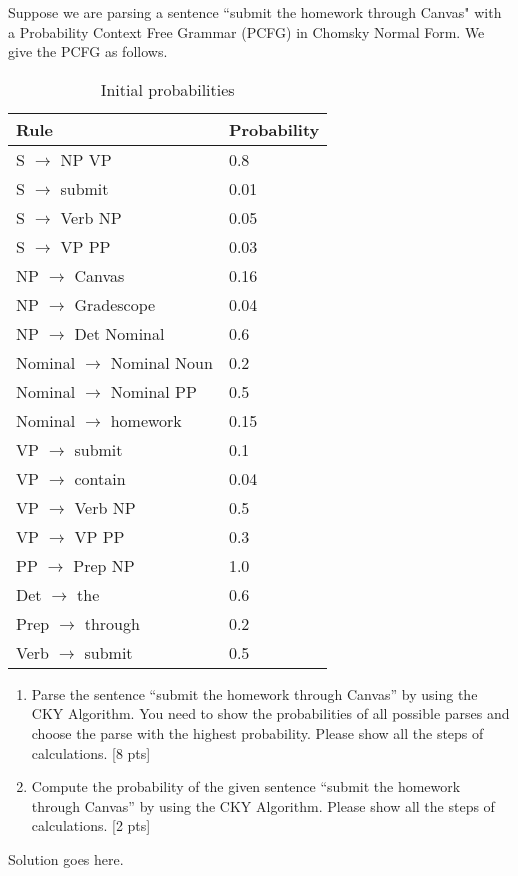 Suppose we are parsing a sentence ``submit the homework through Canvas" with a Probability Context Free Grammar (PCFG) in Chomsky Normal Form. We give the PCFG as follows.

\begin{table}[h]
\centering
\begin{tabular}{|l|l|}
\hline
Rule & Probability  \\ \hline
S $\longrightarrow$ NP VP &  0.8       \\ \hline
S $\longrightarrow$ submit &    0.01      \\ \hline
S $\longrightarrow$ Verb NP &    0.05     \\ \hline
S $\longrightarrow$ VP PP &    0.03     \\ \hline
NP $\longrightarrow$ Canvas &    0.16     \\ \hline
NP $\longrightarrow$ Gradescope &    0.04     \\ \hline
NP $\longrightarrow$ Det Nominal &    0.6     \\ \hline
Nominal $\longrightarrow$ Nominal Noun &    0.2     \\ \hline
Nominal $\longrightarrow$ Nominal PP &    0.5     \\ \hline
Nominal $\longrightarrow$ homework &    0.15     \\ \hline
VP $\longrightarrow$ submit &    0.1     \\ \hline
VP $\longrightarrow$ contain &    0.04     \\ \hline
VP $\longrightarrow$ Verb NP &    0.5    \\ \hline
VP $\longrightarrow$ VP PP &    0.3    \\ \hline
PP $\longrightarrow$ Prep NP &    1.0    \\ \hline
Det $\longrightarrow$ the &    0.6    \\ \hline
Prep $\longrightarrow$ through &    0.2    \\ \hline
Verb $\longrightarrow$ submit &    0.5    \\ \hline


\end{tabular}\caption{Initial probabilities} \label{Tab:Initial}
\end{table}



\begin{enumerate}
    \item Parse the sentence  ``submit the homework through Canvas'' by using the CKY Algorithm. You need to show the probabilities of all possible parses and choose the parse with the highest probability. Please show all the steps of calculations. [8 pts]
    
    \item Compute the probability of the given sentence ``submit the homework through Canvas'' by using the CKY Algorithm. Please show all the steps of calculations.  [2 pts]
    

\end{enumerate}

\begin{solution}
Solution goes here.
\end{solution}